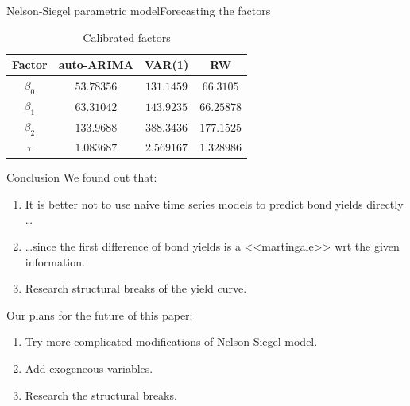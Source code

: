 \documentclass[aspectratio=169]{beamer}
\begin{document}
    \begin{frame}{Nelson-Siegel parametric model}{Forecasting the factors}
        \begin{table}
            \centering
            \begin{tabular}{|c | c c c|} 
                \hline
                Factor & auto-ARIMA & VAR(1) & RW \\
                \hline
                $\beta_0$ & $53.78356$ & $131.1459$ & $66.3105$ \\ 
                \hline
                $\beta_1$ & $63.31042$ & $143.9235$ & $66.25878$ \\
                \hline
                $\beta_2$ & $133.9688$ & $388.3436$ & $177.1525$ \\
                \hline
                $\tau$ & $1.083687$ & $2.569167$ & $1.328986$ \\
                \hline
            \end{tabular}
            \caption{Calibrated factors}
        \end{table}
\end{frame}

    \begin{frame}{Conclusion}
    We found out that:
    \begin{enumerate}
        \item It is better not to use naive time series models to predict bond yields directly \ldots
        \item \ldots since the first difference of bond yields is a <<martingale>> wrt the given information.
        \item Research structural breaks of the yield curve.
    \end{enumerate}
    Our plans for the future of this paper:
    \begin{enumerate}
        \item Try more complicated modifications of Nelson-Siegel model.
        \item Add exogeneous variables.
        \item Research the structural breaks.
    \end{enumerate}
    \end{frame}
\end{document}
